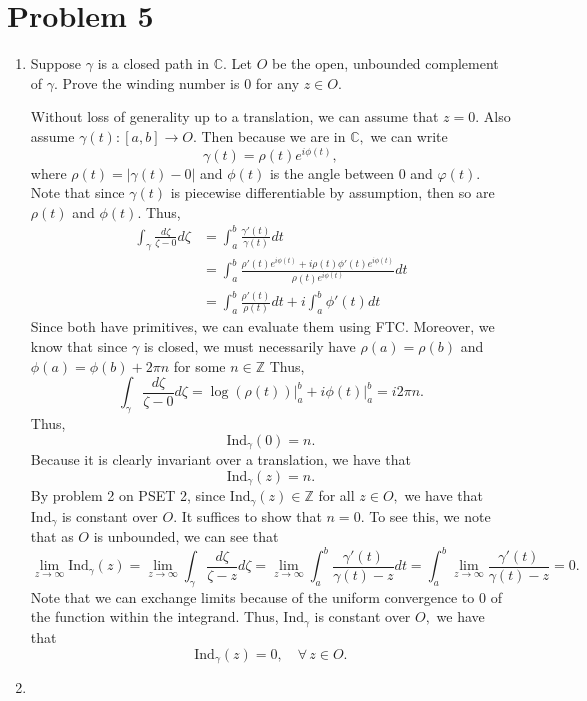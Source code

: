 \documentclass[11pt]{article}
\newcommand{\Ind}{\text{Ind}}
\newcommand{\bbC}{\mathbb{C}}
\newcommand{\bbZ}{\mathbb{Z}}
\begin{document}
\newpage
\section*{Problem 5}
\begin{enumerate}
    \item 
\begin{problem}
Suppose $\gamma$ is a closed path in $\bbC.$ Let $O$ be the open, unbounded complement of $\gamma.$ Prove the winding number is $0$ for any $z\in O.$
\end{problem}

\begin{solution}
Without loss of generality up to a translation, we can assume that $z = 0.$ Also assume $\gamma(t): [a,b] \to O.$ Then because we are in $\bbC,$ we can write
\[\gamma(t) = \rho(t)e^{i\phi(t)},\] where $\rho(t) = |\gamma(t) - 0|$ and $\phi(t)$ is the angle between $0$ and $\varphi(t).$ Note that since $\gamma (t)$ is piecewise differentiable by assumption, then so are $\rho(t)$ and $\phi(t).$
Thus, 
\begin{align*}
    \int_\gamma \frac{d\zeta}{\zeta - 0}d\zeta &= \int_a^b \frac{\gamma'(t)}{\gamma(t) }dt\\
    &= \int_a^b \frac{\rho'(t)e^{i\phi(t)} + i\rho(t)\phi'(t)e^{i\phi (t)}}{\rho(t)e^{i\phi(t)}}dt\\
    &= \int_a^b \frac{\rho'(t)}{\rho(t)} dt + i \int_a^b\phi'(t)dt
\end{align*}
Since both have primitives, we can evaluate them using FTC. Moreover, we know that since $\gamma$ is closed, we must necessarily have $\rho(a) = \rho (b)$ and $\phi(a) = \phi(b)+2\pi n$ for some $n \in \bbZ$ Thus, 
\[\int_\gamma \frac{d\zeta}{\zeta - 0}d\zeta = \log(\rho(t))\bigg|_a^b + i\phi(t)\bigg|_a^b = i2\pi n.\] Thus, 
\[\Ind_\gamma (0) = n.\] Because it is clearly invariant over a translation, we have that 
\[\Ind_\gamma(z) = n.\] By problem 2 on PSET 2, since $\Ind_\gamma(z) \in \bbZ$ for all $z \in O,$ we have that $\Ind_\gamma$ is constant over $O.$ It suffices to show that $n = 0.$ To see this, we note that as $O$ is unbounded, we can see that 
\[\lim_{z\to \infty} \Ind_\gamma(z) = \lim_{z\to \infty}\int_\gamma \frac{d\zeta}{\zeta - z}  d\zeta = \lim_{z\to \infty} \int_a^b \frac{\gamma'(t)}{\gamma(t) - z}dt = \int_a^b \lim_{z\to \infty} \frac{\gamma'(t)}{\gamma(t) - z} =  0.\] Note that we can exchange limits because of the uniform convergence to $0$ of the function within the integrand. Thus, $\Ind_\gamma$ is constant over $O,$ we have that  
\[\Ind_\gamma(z) = 0, \quad \forall\, z\in O.\]
\end{solution}
\item


\end{enumerate}
\end{document}
